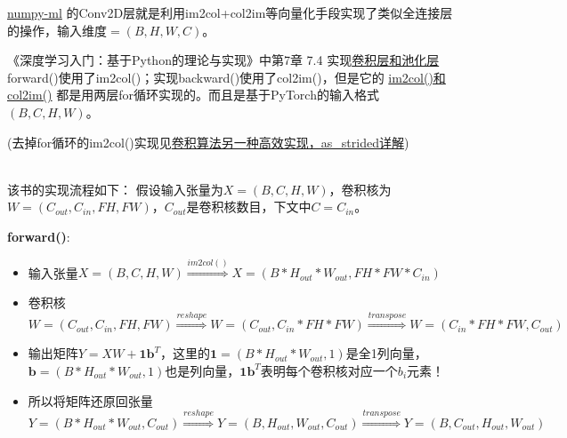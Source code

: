 \documentclass[UTF8]{article}
\begin{document}
    \href{https://github.com/ddbourgin/numpy-ml/blob/master/numpy_ml/neural_nets/layers/layers.py#L2693-L2963}{numpy-ml}
    的Conv2D层就是利用im2col+col2im等向量化手段实现了类似全连接层的操作，输入维度$=(B,H,W,C)$。

    《深度学习入门：基于Python的理论与实现》中第7章 7.4 实现\href{https://github.com/hguomin/deep-learning-from-scratch/blob/master/common/layers.py}{卷积层和池化层}
    forward()使用了im2col()；实现backward()使用了col2im()，但是它的
    \href{https://github.com/hguomin/deep-learning-from-scratch/blob/master/common/util.py}{im2col()和col2im()}
    都是用两层for循环实现的。而且是基于PyTorch的输入格式$(B, C, H, W)$。

    (去掉for循环的im2col()实现见\href{https://zhuanlan.zhihu.com/p/64933417}{卷积算法另一种高效实现，as\_strided详解})

\hspace*{\fill} \\
    该书的实现流程如下：
    假设输入张量为$X=(B,C,H,W)$，卷积核为$W=(C_{out}, C_{in}, FH, FW)$，$C_{out}$是卷积核数目，下文中$C=C_{in}$。

    \textbf{forward()}:
    \begin{itemize}
        \item 输入张量$X=(B,C,H,W) \stackrel{im2col()}{\Longrightarrow} X=(B*H_{out}*W_{out}, FH*FW*C_{in})$
        \item 卷积核$W=(C_{out}, C_{in}, FH, FW) \stackrel{reshape}{\Longrightarrow} W=(C_{out}, C_{in}*FH*FW) \stackrel{transpose}{\Longrightarrow} W=(C_{in}*FH*FW, C_{out})$
        \item 输出矩阵$Y=XW+\boldsymbol{1b}^{T}$，这里的$\boldsymbol{1}=(B*H_{out}*W_{out}, 1)$是全1列向量，$\boldsymbol{b}=(B*H_{out}*W_{out}, 1)$也是列向量，$\boldsymbol{1b}^{T}$表明每个卷积核对应一个$b_{i}$元素！
        \item 所以将矩阵还原回张量$Y=(B*H_{out}*W_{out}, C_{out})\stackrel{reshape}{\Longrightarrow} Y=(B, H_{out}, W_{out}, C_{out}) \stackrel{transpose}{\Longrightarrow}Y=(B,C_{out}, H_{out}, W_{out})$
    \end{itemize}
\end{document}
